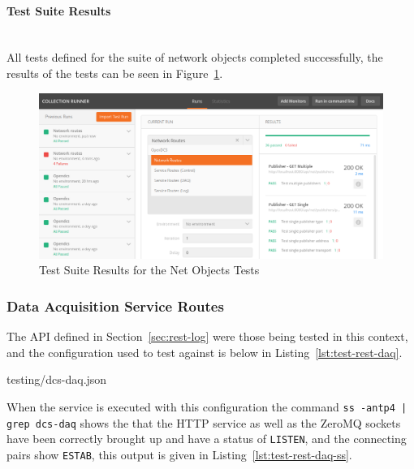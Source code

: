       \newpage
      \paragraph{Test Suite Results}\mbox{}\\

        All tests defined for the suite of network objects completed
        successfully, the results of the tests can be seen in
        Figure~\ref{fig:test-postman-net-suite}.

        \begin{figure}[H]
          \includegraphics[width=\textwidth]{figures/testing/postman-net-suite-results}
          \caption{Test Suite Results for the Net Objects Tests}
          \label{fig:test-postman-net-suite}
        \end{figure}

    \subsubsection{Data Acquisition Service Routes}\label{sec:test-rest-daq}

      The API defined in Section~\ref{sec:rest-log} were those being tested in
      this context, and the configuration used to test against is below in
      Listing~\ref{lst:test-rest-daq}.

      
                      {testing/dcs-daq.json}

      When the service is executed with this configuration the command
      \texttt{ss -antp4 | grep dcs-daq} shows the that the HTTP service as well
      as the ZeroMQ sockets have been correctly brought up and have a status of
      \texttt{LISTEN}, and the connecting pairs show \texttt{ESTAB}, this
      output is given in Listing~\ref{lst:test-rest-daq-ss}.

